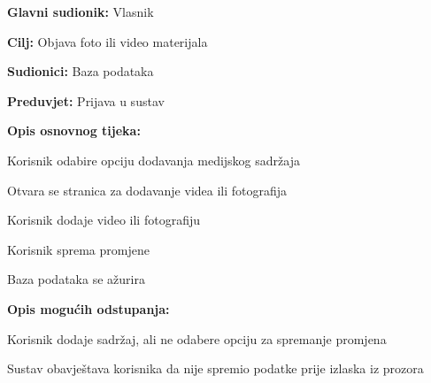 				\noindent {}
				\begin{packed_item}
					
					\item \textbf{Glavni sudionik: } Vlasnik
					\item  \textbf{Cilj:} Objava foto ili video materijala 
					\item  \textbf{Sudionici:} Baza podataka
					\item  \textbf{Preduvjet:} Prijava u sustav
					\item  \textbf{Opis osnovnog tijeka:}
					
					\item[] \begin{packed_enum}
						
						\item Korisnik odabire opciju dodavanja medijskog sadržaja 
						\item Otvara se stranica za dodavanje videa ili fotografija
						\item Korisnik dodaje video ili fotografiju
						\item Korisnik sprema promjene
						\item Baza podataka se ažurira
					\end{packed_enum}
					
					\item  \textbf{Opis mogućih odstupanja:}
					
					\item[] \begin{packed_item}
						
						\item[3.a] Korisnik dodaje sadržaj, ali ne odabere opciju za spremanje promjena
						\item[] \begin{packed_enum}
							
							\item Sustav obavještava korisnika da nije spremio podatke prije izlaska iz prozora
							
						\end{packed_enum}						
					\end{packed_item}
				\end{packed_item}
				
